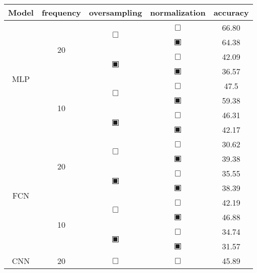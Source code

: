 \begin{table}[H]
	\renewcommand{\arraystretch}{.75}
	\begin{tabular}{|c|c|c|c|c|}
		\hline
		Model & frequency & oversampling & normalization & accuracy \\
		\hline\hline
		\multirow{8}{*}{MLP}& \multirow{4}{*}{20} & \multirow{2}{*}{$\Box$} & $\Box$ & 66.80 \\\cline{4-6}
				    &                    &                         & $\blackinwhitesquare$ & 64.38 \\\cline{3-6}
				    &                    & \multirow{2}{*}{$\blackinwhitesquare$} & $\Box$ & 42.09 \\\cline{4-6}
				    &                    &                         & $\blackinwhitesquare$ & 36.57 \\\cline{2-6}
				    & \multirow{4}{*}{10} & \multirow{2}{*}{$\Box$} & $\Box$ & 47.5 \\\cline{4-6}
				    &                     &                         & $\blackinwhitesquare$ & 59.38 \\\cline{3-6}
				    &                     & \multirow{2}{*}{$\blackinwhitesquare$} & $\Box$ & 46.31 \\\cline{4-6}
				    &                     &                         & $\blackinwhitesquare$ & 42.17 \\\cline{2-6}
		\hline\hline
		\multirow{8}{*}{FCN}& \multirow{4}{*}{20} & \multirow{2}{*}{$\Box$} & $\Box$ & 30.62 \\\cline{4-6}
				    &                    &                         & $\blackinwhitesquare$ & 39.38 \\\cline{3-6}
				    &                    & \multirow{2}{*}{$\blackinwhitesquare$} & $\Box$ & 35.55 \\\cline{4-6}
				    &                    &                         & $\blackinwhitesquare$ & 38.39 \\\cline{2-6}
				    & \multirow{4}{*}{10} & \multirow{2}{*}{$\Box$} & $\Box$ & 42.19 \\\cline{4-6}
				    &                     &                         & $\blackinwhitesquare$ & 46.88 \\\cline{3-6}
				    &                     & \multirow{2}{*}{$\blackinwhitesquare$} & $\Box$ & 34.74 \\\cline{4-6}
				    &                     &                         & $\blackinwhitesquare$ & 31.57 \\\cline{2-6}
		\hline\hline
		\multirow{8}{*}{CNN}& \multirow{4}{*}{20} & \multirow{2}{*}{$\Box$} & $\Box$ & 45.89 \\\cline{4-6}

\end{tabular}
\end{table}
